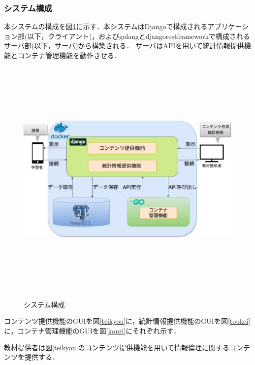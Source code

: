 \subsubsection{システム構成}
本システムの構成を図\ref{system}に示す．本システムはDjangoで構成されるアプリケーション部(以下，クライアント)，およびgolangとdjangorestframeworkで構成されるサーバ部(以下，サーバ)から構築される．
サーバはAPIを用いて統計情報提供機能とコンテナ管理機能を動作させる．

\begin{figure}[htbp]
    \begin{center}
        \includegraphics[width=13cm,height=12cm,keepaspectratio]{system-crop.pdf}\\
    \end{center}
    \caption{システム構成}
    \label{system}
\end{figure}


コンテンツ提供機能のGUIを図\ref{teikyou}に，統計情報提供機能のGUIを図\ref{toukei}に，コンテナ管理機能のGUIを図\ref{kanri}にそれぞれ示す．

教材提供者は図\ref{teikyou}のコンテンツ提供機能を用いて情報倫理に関するコンテンツを提供する．

